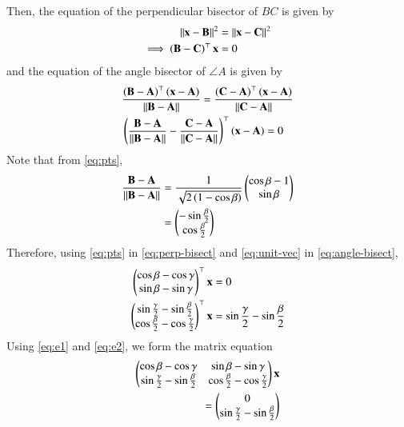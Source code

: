 \documentclass[journal,12pt,twocolumn]{IEEEtran}
\begin{document}
\begin{enumerate}
    Then, the equation of the perpendicular bisector of $BC$ is given by
    \begin{align}
        \left\lVert\mathbf{x}-\mathbf{B}\right\rVert^2&=\left\lVert\mathbf{x}-\mathbf{C}\right\rVert^2 \\
        \implies \left(\mathbf{B}-\mathbf{C}\right)^\top\mathbf{x} &= 0
        \label{eq:perp-bisect}
    \end{align}
    and the equation of the angle bisector of $\angle A$ is given by
    \begin{align}
        &\frac{\left(\mathbf{B}-\mathbf{A}\right)^\top\left(\mathbf{x}-\mathbf{A}\right)}{\left\lVert\mathbf{B}-\mathbf{A}\right\rVert} = \frac{\left(\mathbf{C}-\mathbf{A}\right)^\top\left(\mathbf{x}-\mathbf{A}\right)}{\left\lVert\mathbf{C}-\mathbf{A}\right\rVert} \\
        &\left(\frac{\mathbf{B}-\mathbf{A}}{\left\lVert\mathbf{B}-\mathbf{A}\right\rVert}-\frac{\mathbf{C}-\mathbf{A}}{\left\lVert\mathbf{C}-\mathbf{A}\right\rVert}\right)^\top\left(\mathbf{x}-\mathbf{A}\right) = 0
        \label{eq:angle-bisect}
    \end{align}
    Note that from \eqref{eq:pts},
    \begin{align}
        \frac{\mathbf{B}-\mathbf{A}}{\left\lVert\mathbf{B}-\mathbf{A}\right\rVert} &= \frac{1}{\sqrt{2\left(1-\cos\beta\right)}}\begin{pmatrix}\cos\beta-1\\\sin\beta\end{pmatrix} \\
                                                       &= \begin{pmatrix}-\sin\frac{\beta}{2}\\\cos\frac{\beta}{2}\end{pmatrix}
                                                       \label{eq:unit-vec}
    \end{align}
    Therefore, using \eqref{eq:pts} in \eqref{eq:perp-bisect} and
    \eqref{eq:unit-vec} in \eqref{eq:angle-bisect},
    \begin{align}
        \begin{pmatrix}\cos\beta-\cos\gamma\\\sin\beta-\sin\gamma\end{pmatrix}^\top\mathbf{x} &= 0 \label{eq:e1} \\
        \begin{pmatrix}\sin\frac{\gamma}{2}-\sin\frac{\beta}{2}\\\cos\frac{\beta}{2}-\cos\frac{\gamma}{2}\end{pmatrix}^\top\mathbf{x} &= \sin\frac{\gamma}{2}-\sin\frac{\beta}{2} \label{eq:e2}
    \end{align}
    Using \eqref{eq:e1} and \eqref{eq:e2}, we form the matrix equation
    \begin{align}
        \myvec{\cos\beta-\cos\gamma&\sin\beta-\sin\gamma\\\sin\frac{\gamma}{2}-\sin\frac{\beta}{2}&\cos\frac{\beta}{2}-\cos\frac{\gamma}{2}}\vec{x} \nonumber \\
        = \myvec{0\\\sin\frac{\gamma}{2}-\sin\frac{\beta}{2}}

\end{align}
\end{enumerate}
\end{document}
